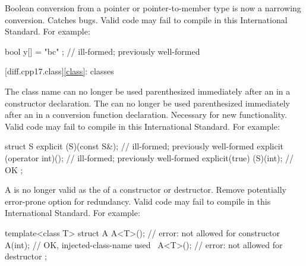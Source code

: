 \change
Boolean conversion from a pointer or pointer-to-member type
is now a narrowing conversion.
\rationale
Catches bugs.
\effect
Valid \CppXVII{} code may fail to compile
in this International Standard. For example:
\begin{codeblock}
bool y[] = { "bc" };    // ill-formed; previously well-formed
\end{codeblock}

[diff.cpp17.class]{\ref{class}: classes}

\change
The class name can no longer be used parenthesized
immediately after an  
in a constructor declaration.
The  can no longer be used parenthesized
immediately after an  
in a conversion function declaration.
\rationale
Necessary for new functionality.
\effect
Valid \CppXVII{} code may fail to compile
in this International Standard. For example:
\begin{codeblock}
struct S {
  explicit (S)(const S&);       // ill-formed; previously well-formed
  explicit (operator int)();    // ill-formed; previously well-formed
  explicit(true) (S)(int);      // OK
};
\end{codeblock}

\change
A 
is no longer valid as the  of a constructor or destructor.
\rationale
Remove potentially error-prone option for redundancy.
\effect
Valid \CppXVII{} code may fail to compile
in this International Standard. For example:
\begin{codeblock}
template<class T>
struct A {
  A<T>();           // error:  not allowed for constructor
  A(int);           // OK, injected-class-name used
  ~A<T>();          // error:  not allowed for destructor
};
\end{codeblock}

